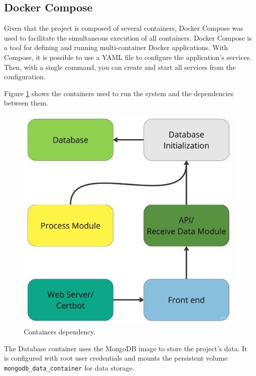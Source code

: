 \subsection{Docker Compose}\label{subsec:containerscompose}

Given that the project is composed of several containers, Docker Compose was used to facilitate the simultaneous execution of all containers. Docker Compose is a tool for defining and running multi-container Docker applications. With Compose, it is possible to use a YAML file to configure the application's services. Then, with a single command, you can create and start all services from the configuration.

Figure \ref{fig:containersDependencyImpl} shows the containers used to run the system and the dependencies between them.

\begin{figure}[htbp]
	\centering
	\includegraphics[scale=0.09]{images/containersDependency.jpg}
	\caption{Containers dependency.}
	\label{fig:containersDependencyImpl}
\end{figure}


The Database container uses the MongoDB image to store the project's data. It is configured with root user credentials and mounts the persistent volume \texttt{mongodb\_data\_container} for data storage.

